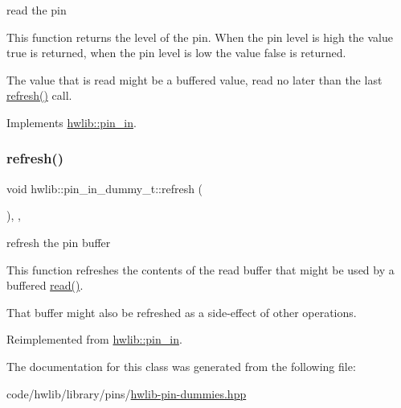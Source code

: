 read the pin

This function returns the level of the pin. When the pin level is high the value true is returned, when the pin level is low the value false is returned.

The value that is read might be a buffered value, read no later than the last \hyperlink{classhwlib_1_1pin__in__dummy__t_ab890235f6b613aac58d6aef96d3460a3}{refresh()} call. 

Implements \hyperlink{classhwlib_1_1pin__in_ad071bd2e17bb4af51390f6cbb728a194}{hwlib\+::pin\+\_\+in}.

\mbox{\label{classhwlib_1_1pin__in__dummy__t_ab890235f6b613aac58d6aef96d3460a3}} 
\subsubsection{\texorpdfstring{refresh()}{refresh()}}
{\footnotesize\ttfamily void hwlib\+::pin\+\_\+in\+\_\+dummy\+\_\+t\+::refresh (\begin{DoxyParamCaption}{ }\end{DoxyParamCaption})\hspace{0.3cm}{\ttfamily [inline]}, {\ttfamily [override]}, {\ttfamily [virtual]}}





refresh the pin buffer

This function refreshes the contents of the read buffer that might be used by a buffered \hyperlink{classhwlib_1_1pin__in__dummy__t_a669c06692e3742532f8887771ae8feb1}{read()}.

That buffer might also be refreshed as a side-\/effect of other operations. 

Reimplemented from \hyperlink{classhwlib_1_1pin__in_a3fb1bfb1ec962bb6d31a5e865f0d0acb}{hwlib\+::pin\+\_\+in}.



The documentation for this class was generated from the following file\+:\begin{DoxyCompactItemize}
\item 
code/hwlib/library/pins/\hyperlink{hwlib-pin-dummies_8hpp}{hwlib-\/pin-\/dummies.\+hpp}\end{DoxyCompactItemize}
